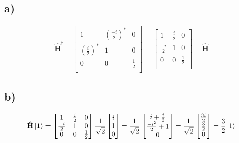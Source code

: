 \documentclass[norsk,a4paper,12pt]{article}
\begin{document}
	\subsection*{a)}
	\begin{equation*}
	\begin{aligned}
	\mathbf{\hat{H}^\dagger} = \begin{bmatrix}
	1 & (\frac{-i}{2})^* & 0 \\
	(\frac{i}{2})^* & 1 & 0 \\
	0 & 0 & \frac{1}{2} \\
	\end{bmatrix}
	= \begin{bmatrix}
	1 & \frac{i}{2} & 0 \\
	\frac{-i}{2} & 1 & 0 \\
	0 & 0 & \frac{1}{2} \\
	\end{bmatrix} = \mathbf{\hat{H}}
	\end{aligned}
	\end{equation*}
	
	\subsection*{b)}
	\begin{equation*}
	\begin{aligned}
	\mathbf{\hat{H}\ket{1}} = \begin{bmatrix}
	1 & \frac{i}{2} & 0 \\
	\frac{-i}{2} & 1 & 0 \\
	0 & 0 & \frac{1}{2} \\
	\end{bmatrix} \frac{1}{\sqrt{2}} \begin{bmatrix}
	i \\
	1 \\
	0 \\
	\end{bmatrix} = \frac{1}{\sqrt{2}} \begin{bmatrix}
	i + \frac{i}{2}\\
	\frac{-i^2}{2} + 1 \\
	0 \\
	\end{bmatrix} = \frac{1}{\sqrt{2}} \begin{bmatrix}
	\frac{3i}{2}\\
	\frac{3}{2} \\
	0 \\
	\end{bmatrix} = \frac{3}{2} \ket{1}
	\end{aligned}
	\end{equation*}
	
\end{document}
